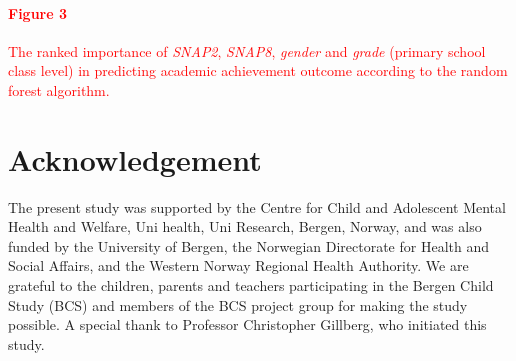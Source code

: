 \documentclass[10pt,letterpaper]{article}
\begin{document}
{{\textcolor{red}{\paragraph{Figure 3} The ranked importance of {\it SNAP2}, {\it SNAP8}, {\it gender} and {\it grade} (primary school class level) in predicting academic achievement outcome according to the random forest algorithm. }


\section*{Acknowledgement}
The present study was supported by the Centre for Child and Adolescent Mental Health and Welfare, Uni health, Uni
Research, Bergen, Norway, and was also funded by the University of Bergen, the Norwegian Directorate for Health and
Social Affairs, and the Western Norway Regional Health Authority. We are grateful to the children, parents and teachers
participating in the Bergen Child Study (BCS) and members of the BCS project group for making the study possible. A
special thank to Professor Christopher Gillberg, who initiated this study.

\newpage

}}
\end{document}
